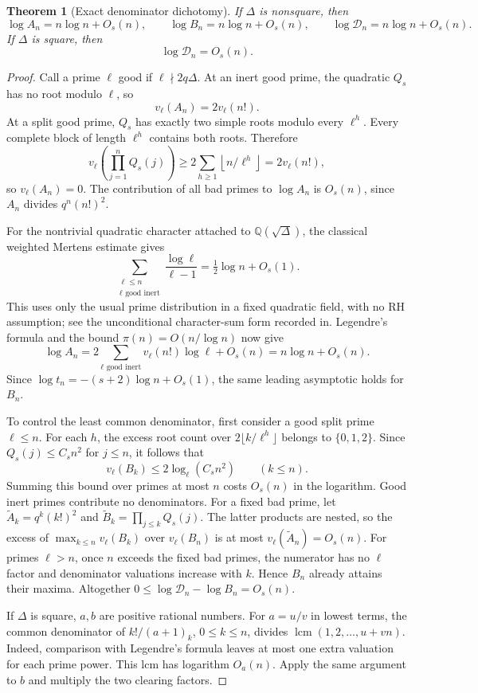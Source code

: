 \documentclass[11pt]{article}
\newtheorem{theorem}{Theorem}[section]
\theoremstyle{remark}
\newcommand{\Q}{\mathbb Q}
\DeclareMathOperator{\lcm}{lcm}
\begin{document}
\begin{theorem}[Exact denominator dichotomy]\label{thm:den}
If $\Delta$ is nonsquare, then
\begin{equation}\label{eq:den-asymp}
 \log A_n=n\log n+O_s(n),\qquad
 \log B_n=n\log n+O_s(n),\qquad
 \log\mathcal D_n=n\log n+O_s(n).
\end{equation}
If $\Delta$ is square, then
\begin{equation}\label{eq:square-den}
 \log\mathcal D_n=O_s(n).
\end{equation}
\end{theorem}
\begin{proof}
Call a prime $\ell$ good if $\ell\nmid2q\Delta$. At an inert good
prime, the quadratic $Q_s$ has no root modulo $\ell$, so
\[
 v_\ell(A_n)=2v_\ell(n!).
\]
At a split good prime, $Q_s$ has exactly two simple roots modulo every
$\ell^h$. Every complete block of length $\ell^h$ contains both
roots. Therefore
\[
 v_\ell\left(\prod_{j=1}^n Q_s(j)\right)
 \ge2\sum_{h\ge1}\left\lfloor n/\ell^h\right\rfloor
 =2v_\ell(n!),
\]
so $v_\ell(A_n)=0$. The contribution of all bad primes to
$\log A_n$ is $O_s(n)$, since $A_n$ divides $q^n(n!)^2$.

For the nontrivial quadratic character attached to
$\Q(\sqrt\Delta)$, the classical weighted Mertens estimate gives
\[
 \sum_{\substack{\ell\le n\\\ell\text{ good inert}}}
      \frac{\log\ell}{\ell-1}
 =\tfrac12\log n+O_s(1).
\]
This uses only the usual prime distribution in a fixed quadratic
field, with no RH assumption; see the unconditional character-sum
form recorded in\cite[Section 1.2]{Zhao}. Legendre's formula and the
bound $\pi(n)=O(n/\log n)$ now give
\[
 \log A_n=2\sum_{\ell\text{ good inert}}v_\ell(n!)\log\ell+O_s(n)
 =n\log n+O_s(n).
\]
Since $\log t_n=-(s+2)\log n+O_s(1)$, the same leading asymptotic
holds for $B_n$.

To control the least common denominator, first consider a good split
prime $\ell\le n$. For each $h$, the excess root count over
$2\lfloor k/\ell^h\rfloor$ belongs to $\{0,1,2\}$. Since
$Q_s(j)\le C_s n^2$ for $j\le n$, it follows that
\[
 v_\ell(B_k)\le2\log_\ell(C_s n^2)\qquad(k\le n).
\]
Summing this bound over primes at most $n$ costs $O_s(n)$ in the
logarithm. Good inert primes contribute no denominators. For a fixed
bad prime, let $\widetilde A_k=q^k(k!)^2$ and
$\widetilde B_k=\prod_{j\le k}Q_s(j)$. The latter products are
nested, so the excess of $\max_{k\le n}v_\ell(B_k)$ over
$v_\ell(B_n)$ is at most $v_\ell(\widetilde A_n)=O_s(n)$.
For primes $\ell>n$, once $n$ exceeds the fixed bad primes, the
numerator has no $\ell$ factor and denominator valuations increase
with $k$. Hence $B_n$ already attains their maxima. Altogether
$0\le\log\mathcal D_n-\log B_n=O_s(n)$.

If $\Delta$ is square, $a,b$ are positive rational numbers. For
$a=u/v$ in lowest terms, the common denominator of
$k!/(a+1)_k$, $0\le k\le n$, divides
$\lcm(1,2,\ldots,u+vn)$. Indeed, comparison with Legendre's formula
leaves at most one extra valuation for each prime power. This lcm has
logarithm $O_a(n)$. Apply the same argument to $b$ and multiply the
two clearing factors.
\end{proof}
\end{document}
